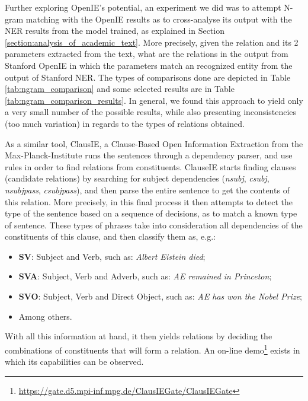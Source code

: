 \documentclass[11pt,a4paper,openright]{memoir}
\begin{document}
Further exploring OpenIE's potential, an experiment we did was to attempt N-gram matching with the OpenIE results as to cross-analyse its output with the NER results from the model trained, as explained in Section \ref{section:analysis_of_academic_text}. More precisely, given the relation and its 2 parameters extracted from the text, what are the relations in the output from Stanford OpenIE in which the parameters match an recognized entity from the output of Stanford NER. The types of comparisons done are depicted in Table \ref{tab:ngram_comparison} and some selected results are in Table \ref{tab:ngram_comparison_results}. In general, we found this approach to yield only a very small number of the possible results, while also presenting inconsistencies (too much variation) in regards to the types of relations obtained.


As a similar tool, ClausIE, a Clause-Based Open Information Extraction \cite{DelCorro:2013:CCO:2488388.2488420} from the Max-Planck-Institute runs the sentences through a dependency parser, and use rules in order to find relations from constituents. ClauseIE starts finding clauses (candidate relations) by searching for subject dependencies (\emph{nsubj}, \emph{csubj}, \emph{nsubjpass}, \emph{csubjpass}), and then parse the entire sentence to get the contents of this relation. More precisely, in this final process it then attempts to detect the type of the sentence based on a sequence of decisions, as to match a known type of sentence. These types of phrases take into consideration all dependencies of the constituents of this clause, and then classify them as, e.g.:
\begin{itemize}
	\item \textbf{SV}: Subject and Verb, such as: \emph{Albert Eistein died};
	\item \textbf{SVA}: Subject,  Verb and Adverb, such as: \emph{AE remained in Princeton};
	\item \textbf{SVO}: Subject,  Verb and Direct Object, such as: \emph{AE has won the Nobel Prize};
	\item Among others.
\end{itemize}
With all this information at hand, it then yields relations by deciding the combinations of constituents that will form a relation. An on-line demo\footnote{\url{https://gate.d5.mpi-inf.mpg.de/ClausIEGate/ClausIEGate}} exists in which its capabilities can be observed.
\end{document}
